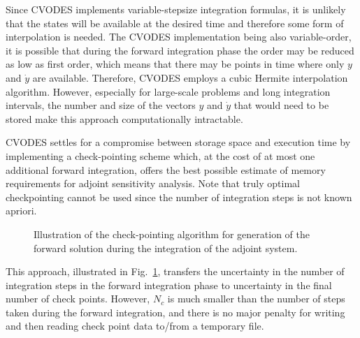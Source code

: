 Since CVODES implements variable-stepsize integration formulas,
it is unlikely that the states will be available at the desired time and
therefore some form of interpolation is needed. The CVODES implementation
being also variable-order, it is possible that during the forward
integration phase the order may be reduced as low as first order,
which means that there may be points in time where only $y$ and ${\dot y}$
are available. Therefore, CVODES employs a cubic Hermite interpolation
algorithm. However, especially for large-scale problems and long integration
intervals, the number and size of the vectors $y$ and ${\dot y}$ that would 
need to be stored make this approach computationally intractable. 

CVODES settles for a compromise between storage space and execution
time by implementing a check-pointing scheme which, at the cost of at
most one additional forward integration, offers the best possible
estimate of memory requirements for adjoint sensitivity analysis.
Note that truly optimal checkpointing \cite{GrWa:00} cannot be used
since the number of integration steps is not known apriori.

%
\begin{figure}
\centerline{}
\caption {Illustration of the check-pointing algorithm for generation of 
  the forward solution during the integration of the adjoint system.}
\label{f:ckpnt}
\end{figure}
This approach, illustrated in Fig.~\ref{f:ckpnt}, transfers the uncertainty in the number of integration
steps in the forward integration phase to uncertainty in the final number of check 
points. However, $N_c$ is much smaller than the number of steps taken during
the forward integration, and there is no major penalty for writing and then reading
check point data to/from a temporary file.
%

